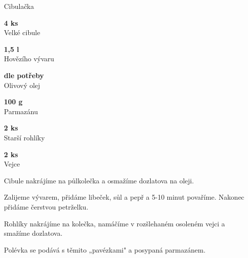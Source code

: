 \documentclass[11pt,a4paper]{article}
\begin{document}
\begin{recipe}[BurntOrange]{Cibulačka}
    \begin{ingredients}
        \item \parbox[t]{\linewidth}{\raggedright \piece \textbf{4 ks}\\ Velké cibule}
        \item \parbox[t]{\linewidth}{\raggedright \liquid \textbf{1,5 l}\\ Hovězího vývaru}
        \item \parbox[t]{\linewidth}{\raggedright \liquid \textbf{dle potřeby}\\ Olivový olej}
        \item \parbox[t]{\linewidth}{\raggedright \weight \textbf{100 g}\\ Parmazánu}
        \item \parbox[t]{\linewidth}{\raggedright \piece \textbf{2 ks}\\ Starší rohlíky}
        \item \parbox[t]{\linewidth}{\raggedright \piece \textbf{2 ks}\\ Vejce}
    \end{ingredients}
    \begin{steps}
        \item Cibule nakrájíme na půlkolečka a osmažíme dozlatova na oleji. 
        \item Zalijeme vývarem, přidáme libeček, sůl a pepř a 5-10 minut povaříme. Nakonec přidáme čerstvou petrželku. 
        \item Rohlíky nakrájíme na kolečka, namáčíme v rozšlehaném osoleném vejci a smažíme dozlatova. 
        \item Polévka se podává s těmito „pavézkami" a posypaná parmazánem.
    \end{steps}
\end{recipe}
\end{document}
